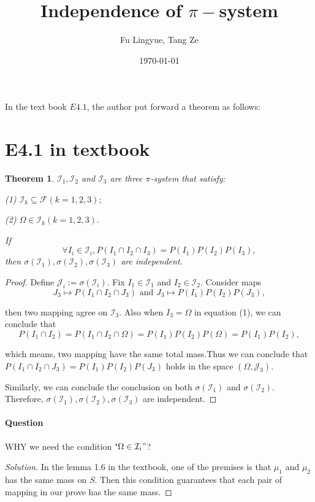 \documentclass[12pt]{article}
\title{Independence of $\pi-$system}
\author{Fu Lingyue, Tang Ze}
\date{\today}
\newtheorem{theorem}{Theorem}
\newenvironment{solution}
  {\begin{proof}[Solution]}
  {\end{proof}}
\begin{document}
\maketitle
In the text book $E4.1$, the author put forward a theorem as follows:
\section{E4.1 in textbook}
\begin{theorem}
  $\mathcal I_1,\mathcal I_2$ and $\mathcal I_3$ are three $\pi$-system that satisfy:
  
  (1) $\mathcal I_k\subseteq \mathcal F(k=1,2,3);$
  
  (2) $\Omega\in \mathcal I_k(k = 1,2,3).$
  
  If 
  \begin{equation}
    \forall I_i \in \mathcal I_i,P(I_1 \cap I_2\cap I_3) = P(I_1)P(I_2)P(I_3),
  \end{equation}
 then $\sigma(\mathcal I_1), \sigma(\mathcal I_2),\sigma(\mathcal I_3)$ are independent.
\end{theorem}
\begin{proof}
Define $\mathcal J_i := \sigma(\mathcal I_i).$
  Fix $I_1 \in \mathcal I_1$ and $I_2 \in \mathcal I_2$. Consider maps
  $$ J_3\mapsto P(I_1\cap I_2\cap J_3) \text{ and }  J_3\mapsto P(I_1)P(I_2)P(J_3),$$
  
 then two mapping agree on $\mathcal I_3$. Also when $I_3 = \Omega$ in equation (1), we can conclude that 
 $$P(I_1\cap I_2) = P(I_1\cap I_2\cap \Omega) = P(I_1)P(I_2)P(\Omega) = P(I_1)P(I_2),$$
 
 which means, two mapping have the same total mass.Thus we can conclude that $P(I_1\cap I_2\cap J_3)=P(I_1)P(I_2)P(J_3)$ holds in the space $(\Omega,\mathcal J_3).$ 
 
 Similarly, we can conclude the conclusion on both $\sigma(\mathcal I_1)$ and $\sigma(\mathcal I_2)$. Therefore, $\sigma(\mathcal I_1), \sigma(\mathcal I_2),\sigma(\mathcal I_3)$ are independent.
\end{proof}

\paragraph{Question} WHY we need the condition "$\Omega\in \mathcal I_i"$?

\begin{solution}
  In the lemma 1.6 in the  textbook, one of the premises is that $\mu_1$ and $\mu_2$ has the same mass on $S$. Then this condition guarantees that each pair of mapping in our prove has the same mass.
\end{solution}
\end{document}

